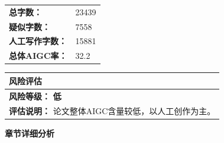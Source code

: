 \documentclass[UTF8,a4paper]{article}
\begin{document}
\begin{center}
\begin{minipage}{0.35\textwidth}
\vspace{0.1cm}
\begin{tabular}{ll}
\footnotesize
\textbf{总字数：} & 23439 \\
\textbf{疑似字数：} & 7558 \\
\textbf{人工写作字数：} & 15881 \\
\textbf{总体AIGC率：} & 32.2%
\end{tabular}
\end{minipage}
\end{center}

\vspace{0.3cm}

\begin{center}
\renewcommand{\arraystretch}{1.2}
\begin{tabular}{|p{14cm}|}
\hline
\rowcolor{deepblue}
\color{white}\textbf{风险评估} \\
\hline
\textbf{风险等级：} \textbf{低} \\
\hline
\textbf{评估说明：} 论文整体AIGC含量较低，以人工创作为主。 \\
\hline
\end{tabular}
\end{center}

\newpage


\thispagestyle{fancy}

\begin{center}
{\Large\bfseries\color{deepblue} 章节详细分析}
\end{center}

\vspace{0.5cm}
\end{document}
